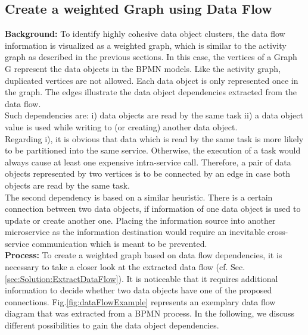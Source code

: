 \subsection{Create a weighted Graph using Data Flow}
\label{sec:Solution:CreateGraphData}
\textbf{Background:} To identify highly cohesive data object clusters, the data flow information is visualized as a weighted graph, which is similar to the activity graph as described in the previous sections. In this case, the vertices of a Graph G represent the data objects in the BPMN models. Like the activity graph, duplicated vertices are not allowed. Each data object is only represented once in the graph. The edges illustrate the data object dependencies extracted from the data flow. \\
Such dependencies are: i) data objects are read by the same task ii) a data object value is used while writing to (or creating) another data object. \\
Regarding i), it is obvious that data which is read by the same task is more likely to be partitioned into the same service. Otherwise, the execution of a task would always cause at least one expensive intra-service call.
Therefore, a pair of data objects represented by two vertices is to be connected by an edge in case both objects are read by the same task.\\
The second dependency is based on a similar heuristic. There is a certain connection between two data objects, if information of one data object is used to update or create another one. Placing the information source into another microservice as the information destination would require an inevitable cross-service communication which is meant to be prevented. \\

\noindent
\textbf{Process:} To create a weighted graph based on data flow dependencies, it is necessary to take a closer look at the extracted data flow (cf. Sec.\ref{sec:Solution:ExtractDataFlow}). It is noticeable that it requires additional information to decide whether two data objects have one of the proposed connections. Fig.\ref{fig:dataFlowExample} represents an exemplary data flow diagram that was extracted from a BPMN process. In the following, we discuss different possibilities to gain the data object dependencies.


